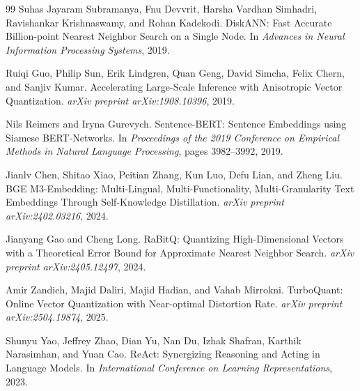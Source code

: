 \documentclass[11pt]{article}
\begin{document}
\begin{thebibliography}{99}
Suhas Jayaram Subramanya, Fnu Devvrit, Harsha Vardhan Simhadri, Ravishankar Krishnaswamy, and Rohan Kadekodi.
\newblock DiskANN: Fast Accurate Billion-point Nearest Neighbor Search on a Single Node.
\newblock In \emph{Advances in Neural Information Processing Systems}, 2019.

Ruiqi Guo, Philip Sun, Erik Lindgren, Quan Geng, David Simcha, Felix Chern, and Sanjiv Kumar.
\newblock Accelerating Large-Scale Inference with Anisotropic Vector Quantization.
\newblock \emph{arXiv preprint arXiv:1908.10396}, 2019.

Nils Reimers and Iryna Gurevych.
\newblock Sentence-BERT: Sentence Embeddings using Siamese BERT-Networks.
\newblock In \emph{Proceedings of the 2019 Conference on Empirical Methods in Natural Language Processing}, pages 3982--3992, 2019.

Jianlv Chen, Shitao Xiao, Peitian Zhang, Kun Luo, Defu Lian, and Zheng Liu.
\newblock BGE M3-Embedding: Multi-Lingual, Multi-Functionality, Multi-Granularity Text Embeddings Through Self-Knowledge Distillation.
\newblock \emph{arXiv preprint arXiv:2402.03216}, 2024.

Jianyang Gao and Cheng Long.
\newblock RaBitQ: Quantizing High-Dimensional Vectors with a Theoretical Error Bound for Approximate Nearest Neighbor Search.
\newblock \emph{arXiv preprint arXiv:2405.12497}, 2024.

Amir Zandieh, Majid Daliri, Majid Hadian, and Vahab Mirrokni.
\newblock TurboQuant: Online Vector Quantization with Near-optimal Distortion Rate.
\newblock \emph{arXiv preprint arXiv:2504.19874}, 2025.

Shunyu Yao, Jeffrey Zhao, Dian Yu, Nan Du, Izhak Shafran, Karthik Narasimhan, and Yuan Cao.
\newblock ReAct: Synergizing Reasoning and Acting in Language Models.
\newblock In \emph{International Conference on Learning Representations}, 2023.

\end{thebibliography}
\end{document}
